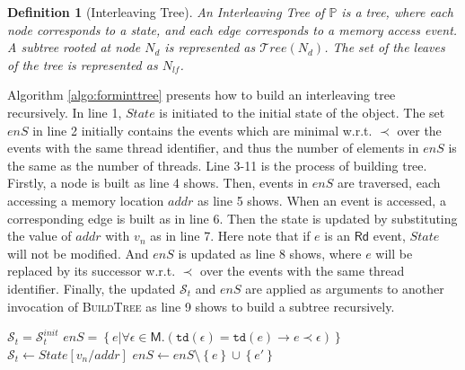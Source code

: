 \documentclass[runningheads]{llncs}
\newcommand{\eread}{\mathsf{Rd}}
\newcommand{\pair}[1]{{\langle{#1}\rangle}}
\newcommand{\set}[1]{\left\{{#1}\right\}}
\newtheorem{myDef}{Definition}
\begin{document}
\begin{myDef}[Interleaving Tree]
    An \textit{Interleaving Tree} of $\mathbb{P}$ is a tree, where each node corresponds to a state, and each edge corresponds to a memory access event. A subtree rooted at node $N_d$ is represented as $\mathcal{T}ree(N_d)$. The set of the leaves of the tree is represented as $N_{lf}$.
\end{myDef}

    Algorithm \ref{algo:forminttree} presents how to build an interleaving tree recursively. In line 1, $State$ is initiated to the initial state of the object. The set $\mathit{enS}$ in line 2 initially contains the events which are minimal w.r.t. $\prec$ over the events with the same thread identifier, and thus the number of elements in $\mathit{enS}$ is the same as the number of threads. Line 3-11 is the process of building tree. Firstly, a node is built as line 4 shows. Then, events in $\mathit{enS}$ are traversed, each accessing a memory location $addr$ as line 5 shows. When an event is accessed, a corresponding edge is built as in line 6. Then the state is updated by substituting the value of $addr$ with $v_n$ as in line 7. Here note that if $e$ is an $\eread$ event, $State$ will not be modified. And $\mathit{enS}$ is updated as line 8 shows, where $e$ will be replaced by its successor w.r.t. $\prec$ over the events with the same thread identifier. Finally, the updated $\mathcal{S}_t$ and $\mathit{enS}$ are applied as arguments to another invocation of \textsc{BuildTree} as line 9 shows to build a subtree recursively.



\begin{algorithm}
    \caption{Building of Interleaving Tree}\label{algo:forminttree}
    \begin{algorithmic}[1]
        \State $\mathcal{S}_t = \mathcal{S}_t^{init}$
        \State $\mathit{enS} = \left\{ e | \forall \epsilon\in \mathsf{M} .(\mathtt{td}(\epsilon)=\mathtt{td}(e)\longrightarrow e\prec \epsilon)\right\}$
            \State {}
            \For{$e(addr,v_n)^{\pair{o,t}} \leftarrow \mathit{enS}$}
                \State {}
                \State $\mathcal{S}_t \gets \mathit{State[v_n/addr]}$
                \State $\mathit{enS} \gets \mathit{enS}\setminus \set{e} \cup \set{e'}$
                \State {}
            \EndFor
        \EndFunction
    \end{algorithmic}
\end{algorithm}
\end{document}
